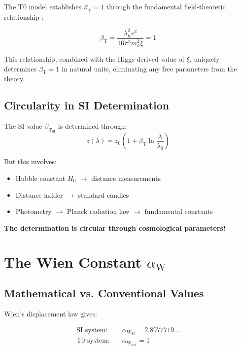 \documentclass[12pt,a4paper]{article}
\newcommand{\xipar}{\xi}
\newcommand{\alphaW}{\alpha_{\text{W}}}
\newcommand{\betaT}{\beta_{\text{T}}}
\newcommand{\lambdah}{\lambda_h}
\newcommand{\pichar}{\pi}
\begin{document}
	The T0 model establishes $\betaT = 1$ through the fundamental field-theoretic relationship \cite{pascher_derivation_beta_2025}:
	
	\begin{equation}
		\betaT = \frac{\lambdah^2 v^2}{16\pichar^3 m_h^2 \xipar} = 1
		\label{eq:beta_t_field_theory}
	\end{equation}
	
	This relationship, combined with the Higgs-derived value of $\xipar$, uniquely determines $\betaT = 1$ in natural units, eliminating any free parameters from the theory.
	
	\subsection{Circularity in SI Determination}
	\label{subsec:beta_circularity}
	
	The SI value $\betaT_{\text{SI}}$ is determined through:
	$$z(\lambda) = z_0\left(1 + \betaT \ln\frac{\lambda}{\lambda_0}\right)$$
	
	But this involves:
	\begin{itemize}
		\item Hubble constant $H_0$ $\rightarrow$ distance measurements
		\item Distance ladder $\rightarrow$ standard candles
		\item Photometry $\rightarrow$ Planck radiation law $\rightarrow$ fundamental constants
	\end{itemize}
	
	\textbf{The determination is circular through cosmological parameters!}
	
	\section{The Wien Constant $\alphaW$}
	\label{sec:alpha_w}
	
	\subsection{Mathematical vs. Conventional Values}
	\label{subsec:wien_values}
	
	Wien's displacement law gives:
	
	\begin{align}
		\text{SI system:} \quad &\alphaW_{\text{SI}} = 2.8977719... \\
		\text{T0 system:} \quad &\alphaW_{\text{nat}} = 1
	\end{align}
	
\end{document}

